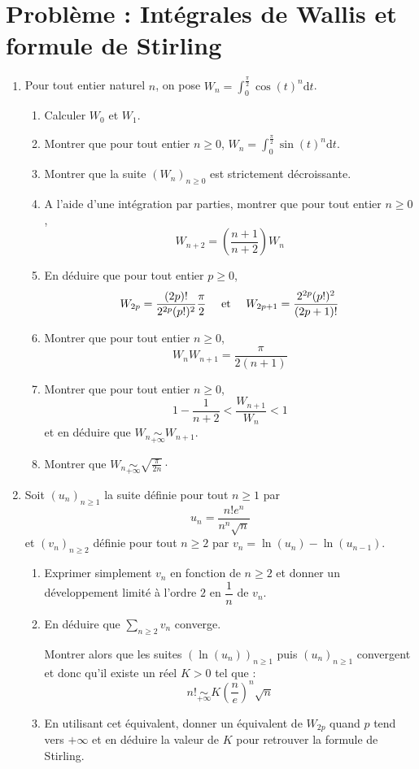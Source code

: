 \documentclass[a4paper,french,11pt,twoside]{VcCours}
\newcommand{\dt}{\text{d}t}
\begin{document}
\section*{Problème : Intégrales de Wallis et formule de Stirling}
\begin{enumerate}
   \item Pour tout entier naturel $n$, on pose $W_n = \int_{0}^{\frac{\pi}{2}} \cos(t)^n \dt$.
   
   \begin{enumerate}
   \item Calculer $W_0$ et $W_1$.
   \item Montrer que pour tout entier $n \geq 0$, $W_n= \int_{0}^{\frac{\pi}{2}} \sin(t)^n \dt$.
   \item Montrer que la suite $(W_n)_{n\geq 0}$ est strictement décroissante.
   \item A l'aide d'une intégration par parties, montrer que pour tout entier $n \geq 0$,
   $$ W_{n+2} = \left( \frac{n+1}{n+2} \right) W_n $$
   \item En déduire que pour tout entier $p \geq 0$,
   $$ W_{2p} = \frac{(2p)!}{2^{2p} (p!)^2} \frac{\pi}{2} \quad \hbox{ et }  \quad W_{2p+1} = \frac{2^{2p} (p!)^2}{(2p+1)!}$$
   \item Montrer que pour tout entier $n  \geq 0$,
   $$ W_n W_{n+1} =  \frac{\pi}{2(n+1)}$$
   \item Montrer que pour tout entier $n \geq 0$,
   $$1- \frac{1}{n+2}< \frac{W_{n+1}}{W_n}<1$$
   et en déduire que $W_n \underset{+ \infty}{\sim} W_{n+1}$.
   \item Montrer que $W_n \underset{+ \infty}{\sim} \sqrt{\frac{\pi}{2n}} \cdot$
   \end{enumerate}
   
   \bigskip
   
   \item Soit $(u_n)_{n\geq1}$ la suite définie pour tout $n \geq 1$ par 
   $$u_n = \dfrac{n! e^n}{n^n \sqrt{n}}$$
   et $(v_n)_{n \geq 2}$ définie pour tout $n \geq 2$ par $ v_n = \ln(u_n) - \ln(u_{n-1})$.
   
   \medskip
   
   \begin{enumerate}
   \item Exprimer simplement $v_n$ en fonction de $n \geq 2$ et donner un développement limité à l'ordre $2$ en $\dfrac{1}{n}$ de $v_n$.
   \item En déduire que $\sum_{n \geq 2} v_n$ converge. 
   
   \noindent Montrer alors que les suites $(\ln(u_n))_{n \geq 1}$ puis $(u_n)_{n \geq 1}$ convergent et donc qu'il existe un réel $K>0$ tel que :
   $$ n!  \underset{+ \infty}{\sim} K \left( \frac{n}{e} \right)^n \sqrt{n}$$
   \item En utilisant cet équivalent, donner un équivalent de $W_{2p}$ quand $p$ tend vers $+ \infty$ et en déduire la valeur de $K$ pour retrouver la formule de Stirling.
   \end{enumerate}
   \end{enumerate}
\end{document}
